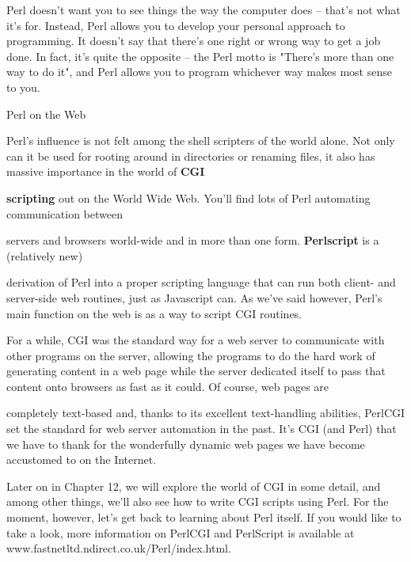 \documentclass[a4paper,11pt]{book}
\begin{document}
\noindent Perl doesn't want you to see things the way the computer does -- that's not what it's for. Instead, Perl allows you to develop your personal approach to programming. It doesn't say that there's one right or wrong way to get a job done. In fact, it's quite the opposite -- the Perl motto is "There's more than one way to do it", and Perl allows you to program whichever way makes most sense to you.

\noindent 

\noindent Perl on the Web

\noindent Perl's influence is not felt among the shell scripters of the world alone. Not only can it be used for rooting around in directories or renaming files, it also has massive importance in the world of \textbf{CGI}

\noindent 

\noindent 

\noindent \textbf{scripting }out on the World Wide  Web.  You'll  find  lots  of  Perl  automating  communication  between

\noindent servers and browsers world-wide  and  in  more  than  one  form.  \textbf{Perlscript  }is  a  (relatively  new)

\noindent derivation of Perl into  a  proper  scripting  language  that  can  run  both  client-  and server-side  web routines,  just as Javascript can.  As  we've  said  however,  Perl's  main  function  on  the web  is  as  a  way to script CGI routines.

\noindent 

\noindent For a while, CGI was the standard way for a web server to communicate with other programs on the server, allowing the programs to do the hard work of generating content in a web page while the server dedicated itself to pass that content onto browsers as fast as it could. Of course, web pages are

\noindent completely text-based and, thanks to its excellent text-handling abilities, PerlCGI set the standard for web server automation in the past. It's CGI (and Perl) that we have to thank for the wonderfully dynamic web pages we have become accustomed to on the Internet.

\noindent 

\noindent Later on in Chapter 12, we will explore the world of CGI in some detail, and among other things, we'll also see how to write CGI scripts using Perl. For the moment, however, let's get back to learning about Perl itself. If you would like to take a look, more information on PerlCGI and PerlScript is available at www.fastnetltd.ndirect.co.uk/Perl/index.html.
\end{document}
